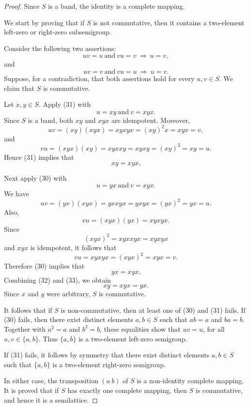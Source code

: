 \documentclass[11pt]{article}
\theoremstyle{plain}
\theoremstyle{remark}
\theoremstyle{definition}
\theoremstyle{plain}
\begin{document}
\begin{proof}
    Since $S$ is a band, 
    the identity is a complete mapping.

    We start by proving that if $S$ is not commutative, then it contains a two-element left-zero or right-zero
    subsemigroup.

    Consider the following two assertions:
    \[
        uv=u\ \text{and}\ vu=v
        \ \Rightarrow\ 
        u=v,
        \tag{30}
    \]
    and
    \[
        uv=v\ \text{and}\ vu=u
        \ \Rightarrow\ 
        u=v.
        \tag{31}
    \]
    Suppose, for a contradiction, that both assertions hold for every
    $u,v\in S$. We claim  that $S$ is commutative.

    Let $x,y\in S$. Apply (31) with
    \[
        u=xy
        \ \text{and}\ 
        v=xyx.
    \]
    Since $S$ is a band, both $xy$ and $xyx$ are
    idempotent. Moreover,
    \[
        uv=(xy)(xyx)=xyxyx=(xy)^2x=xyx=v,
    \]
    and
    \[
        vu=(xyx)(xy)=xyxxy=xyxy=(xy)^2=xy=u.
    \]
    Hence (31) implies that
    \[
        xy=xyx.
        \tag{32}
    \]

    Next apply (30) with
    \[
        u=yx
        \ \text{and}\ 
        v=xyx.
    \]
    We have
    \[
        uv=(yx)(xyx)=yxxyx=yxyx=(yx)^2=yx=u.
    \]
    Also,
    \[
        vu=(xyx)(yx)=xyxyx.
    \]
    Since
    \[
        (xyx)^2=xyxxyx=xyxyx
    \]
    and $xyx$ is idempotent, it follows that
    \[
        vu=xyxyx=(xyx)^2=xyx=v.
    \]
    Therefore (30) implies that
    \[
        yx=xyx.
        \tag{33}
    \]
    Combining (32) and (33), we obtain
    \[
        xy=xyx=yx.
    \]
    Since $x$ and $y$ were arbitrary, $S$ is commutative.

    It follows that if $S$ is non-commutative, then at least one of (30)
    and (31) fails. If (30) fails, then there exist distinct elements
    $a,b\in S$ such that
   $ab=a$
        and $ba=b$. 
    Together with $a^2=a$ and $b^2=b$, these equalities show that
   $uv=u$, 
    for all $u,v\in\{a,b\}$. Thus $\{a,b\}$ is a two-element left-zero
    semigroup.

    If (31) fails, it follows by symmetry that  there exist distinct elements
$a,b\in S$ such that $\{a,b\}$ is a two-element right-zero semigroup.

    In either case, the transposition $(a\ b)$ of $S$  is a non-identity complete mapping.
It is proved that if $S$ has exactly one complete mapping, then $S$ is
commutative, and hence it is a semilattice.


\end{proof}
\end{document}
